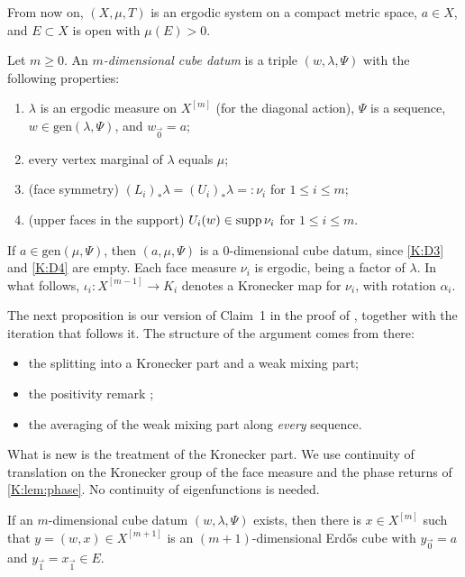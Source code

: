 From now on, $(X,\mu,T)$ is an ergodic system on a compact metric space, $a\in X$, and
$E\subset X$ is open with $\mu(E)>0$.

\begin{definition}\label{K:def:datum}
Let $m\ge0$. An \emph{$m$-dimensional cube datum} is a triple $(w,\lambda,\Psi)$ with the
following properties:
\begin{enumerate}[label=(D\arabic*)]
\item\label{K:D1} $\lambda$ is an ergodic measure on $X^{[m]}$ (for the diagonal action),
$\Psi$ is a \Fol{} sequence, $w\in\mathrm{gen}(\lambda,\Psi)$, and $w_{\vec0}=a$;
\item\label{K:D2} every vertex marginal of $\lambda$ equals $\mu$;
\item\label{K:D3} (face symmetry) $(L_i)_*\lambda=(U_i)_*\lambda=:\nu_i$ for $1\le i\le m$;
\item\label{K:D4} (upper faces in the support) $U_i(w)\in\operatorname{supp}\nu_i$ for $1\le i\le m$.
\end{enumerate}
\end{definition}

If $a\in\mathrm{gen}(\mu,\Psi)$, then $(a,\mu,\Psi)$ is a $0$-dimensional cube datum, since
\ref{K:D3} and \ref{K:D4} are empty.
Each face measure $\nu_i$ is ergodic, being a factor of $\lambda$. In what follows,
$\iota_i\colon X^{[m-1]}\to K_i$ denotes a Kronecker map for $\nu_i$, with rotation $\alpha_i$.

The next proposition is our version of Claim~1 in the proof of
\cite[Theorem~3.1]{kra2026short}, together with the iteration that follows it.
The structure of the argument comes from there:
\begin{itemize}
\item the splitting into a Kronecker part and a weak mixing part;
\item the positivity remark \cite[Remark~2.2]{kra2026short};
\item the averaging of the weak mixing part along \emph{every} \Fol{} sequence.
\end{itemize}
What is new is the treatment of the Kronecker part. We use continuity of translation on
the Kronecker group of the face measure and the phase returns of \cref{K:lem:phase}. No
continuity of eigenfunctions is needed.

\begin{proposition}\label{K:prop:criterion}
If an $m$-dimensional cube datum $(w,\lambda,\Psi)$ exists, then there is $x\in X^{[m]}$ such
that $y=(w,x)\in X^{[m+1]}$ is an $(m+1)$-dimensional Erdős cube with $y_{\vec0}=a$ and
$y_{\vec1}=x_{\vec1}\in E$.
\end{proposition}

